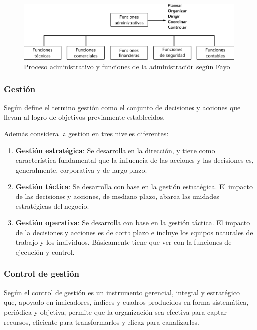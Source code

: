 \begin{figure}[h]
    \centering
    \captionsetup{justification=centering}
    \includegraphics[width=1.0\textwidth]{Imagenes/Bitmap/funciones_adm}
    \caption{Proceso administrativo y funciones de la administración según Fayol}
    \label{fig:adm}
\end{figure}

\subsubsection{Gestión}
Según \cite{beltran} define el termino gestión como el conjunto de decisiones
y acciones que llevan al logro de objetivos previamente establecidos.

Además \cite{beltran} considera la gestión en tres niveles diferentes:
\begin{enumerate}
    \item \textbf{Gestión estratégica}: Se desarrolla en la dirección, y tiene como
          característica fundamental que la influencia de las acciones y las decisiones
          es, generalmente, corporativa y de largo plazo.
    \item \textbf{Gestión táctica}: Se desarrolla con base en la gestión
          estratégica. El impacto de las decisiones y acciones, de mediano plazo,
          abarca las unidades estratégicas del negocio.
    \item \textbf{Gestión operativa}: Se desarrolla con base en la gestión
          táctica. El impacto de la decisiones y acciones es de corto plazo e incluye
          los equipos naturales de trabajo y los individuos. Básicamente tiene
          que ver con la funciones de ejecución y control.
\end{enumerate}

\subsubsection{Control de gestión}
Según \cite{beltran} el control de gestión es un instrumento gerencial, integral
y estratégico que, apoyado en indicadores, índices y cuadros producidos en forma
sistemática, periódica y objetiva, permite que la organización sea efectiva para
captar recursos, eficiente para transformarlos y eficaz para canalizarlos.

